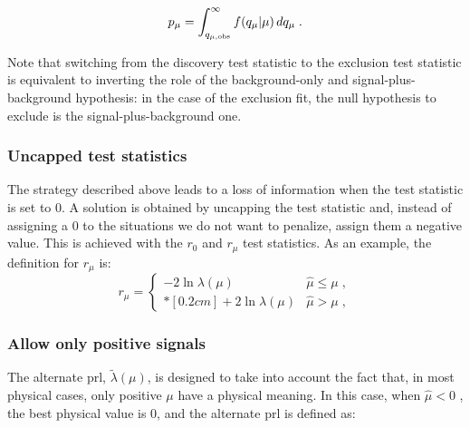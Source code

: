 \begin{equation}
\label{eq:stat:pmu}
p_{\mu} = \int_{q_{\mu,{\rm obs}}}^{\infty} f(q_{\mu} | \mu ) \, d q_{\mu} \;.
\end{equation}

\noindent Note that switching from the discovery test statistic to the exclusion test statistic is equivalent to inverting the role of the background-only and signal-plus-background hypothesis: in the case of the exclusion fit, the null hypothesis to exclude is the signal-plus-background one.


\subsubsection*{Uncapped test statistics}

The strategy described above leads to a loss of information when the test statistic is set to 0. A solution is obtained by uncapping the test statistic and, instead of assigning a 0 to the situations we do not want to penalize, assign them a negative value. This is achieved with the $r_0$ and $r_\mu$ test statistics. As an example, the definition for $r_\mu$ is:
\begin{equation}
\label{eq:rmu}
r_{\mu} =
\left\{ \! \! \begin{array}{ll}
               - 2 \ln \lambda(\mu)  & \hat{\mu} \le \mu  \;, \\*[0.2 cm]
               + 2 \ln \lambda(\mu)  & \hat{\mu} > \mu  \;,
              \end{array}
       \right.
\end{equation}

 
\subsubsection*{Allow only positive signals}

The alternate \gls{prl}, $\tilde{\lambda}({\mu})$, is designed to take into account the fact that, in most physical cases, only positive $\mu$ have a physical meaning. In this case, when $\hat{\mu} < 0$ , the best physical value is 0, and the alternate \gls{prl} is defined as: 

